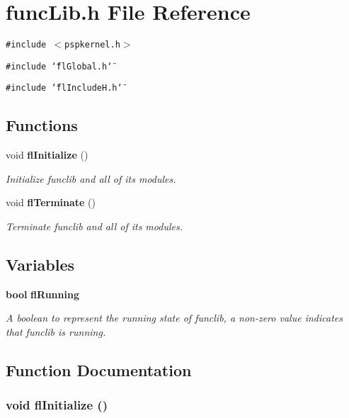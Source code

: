 \section{func\-Lib.h File Reference}
\label{funcLib_8h}
{\tt \#include $<$pspkernel.h$>$}\par
{\tt \#include \char`\"{}fl\-Global.h\char`\"{}}\par
{\tt \#include \char`\"{}fl\-Include\-H.h\char`\"{}}\par
\subsection*{Functions}
\begin{CompactItemize}
\item 
void {\bf fl\-Initialize} ()
\begin{CompactList}\small\item\em Initialize funclib and all of its modules. \item\end{CompactList}\item 
void {\bf fl\-Terminate} ()
\begin{CompactList}\small\item\em Terminate funclib and all of its modules. \item\end{CompactList}\end{CompactItemize}
\subsection*{Variables}
\begin{CompactItemize}
\item 
{\bf bool} {\bf fl\-Running}
\begin{CompactList}\small\item\em A boolean to represent the running state of funclib, a non-zero value indicates that funclib is running. \item\end{CompactList}\end{CompactItemize}


\subsection{Function Documentation}
\subsubsection{\setlength{\rightskip}{0pt plus 5cm}void fl\-Initialize ()}\label{funcLib_8h_77803041c232261f158b071f587b9d08}


